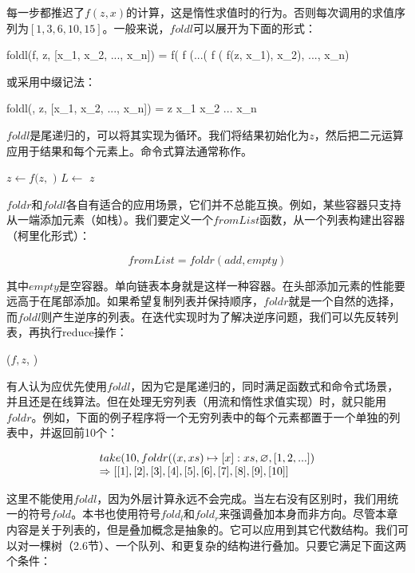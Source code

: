 \documentclass[b5paper]{ctexart}
\begin{document}
每一步都推迟了$f(z, x)$的计算，这是惰性求值时的行为。否则每次调用的求值序列为$[1, 3, 6, 10, 15]$。一般来说，$foldl$可以展开为下面的形式：

\be
foldl(f, z, [x_1, x_2, ..., x_n]) = f( f (...( f ( f(z, x_1), x_2), ..., x_n)
\ee

或采用中缀记法：

\be
foldl(\oplus, z, [x_1, x_2, ..., x_n]) = z \oplus x_1 \oplus x_2 \oplus ... \oplus x_n
\ee

$foldl$是尾递归的，可以将其实现为循环。我们将结果初始化为$z$，然后把二元运算应用于结果和每个元素上。命令式算法通常称作。

\begin{algorithmic}[1]
    \State $z \gets f(z, $  $)$
    \State $L \gets$ 
  \EndWhile
  \State \Return $z$
\EndFunction
\end{algorithmic}

$foldr$和$foldl$各自有适合的应用场景，它们并不总能互换。例如，某些容器只支持从一端添加元素（如栈）。我们要定义一个$\textit{fromList}$函数，从一个列表构建出容器（柯里化形式）：

\[
\textit{fromList} = foldr(add, empty)
\]

其中$empty$是空容器。单向链表本身就是这样一种容器。在头部添加元素的性能要远高于在尾部添加。如果希望复制列表并保持顺序，$foldr$就是一个自然的选择，而$foldl$则产生逆序的列表。在迭代实现时为了解决逆序问题，我们可以先反转列表，再执行reduce操作：

\begin{algorithmic}[1]
  \State \Return {}($f, z$, )
\EndFunction
\end{algorithmic}

有人认为应优先使用$foldl$，因为它是尾递归的，同时满足函数式和命令式场景，并且还是在线算法。但在处理无穷列表（用流和惰性求值实现）时，就只能用$foldr$。例如，下面的例子程序将一个无穷列表中的每个元素都置于一个单独的列表中，并返回前10个：

\[
\begin{array}{l}
take(10, foldr((x, xs) \mapsto [x]:xs, \varnothing, [1, 2, ...]) \\
\Rightarrow [[1], [2], [3], [4], [5], [6], [7], [8], [9], [10]]
\end{array}
\]

这里不能使用$foldl$，因为外层计算永远不会完成。当左右没有区别时，我们用统一的符号$fold$。本书也使用符号$fold_l$和$fold_r$来强调叠加本身而非方向。尽管本章内容是关于列表的，但是叠加概念是抽象的。它可以应用到其它代数结构。我们可以对一棵树（\cite{unplugged}2.6节）、一个队列、和更复杂的结构进行叠加。只要它满足下面这两个条件：
\end{document}
